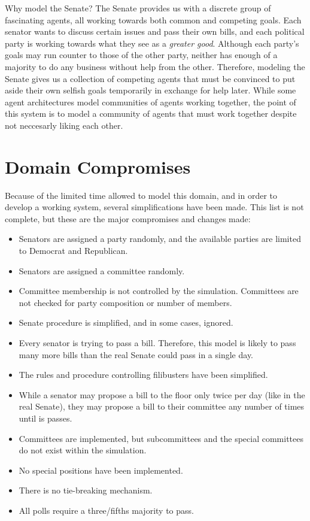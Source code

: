 \documentclass{sig-alternate}
\newenvironment{smallitem}
 {\setlength{\topsep}{0pt}
  \setlength{\partopsep}{0pt}
  \setlength{\parskip}{0pt}
  \begin{itemize}
   \setlength{\leftmargin}{.2in}
  \setlength{\parsep}{0pt}
  \setlength{\parskip}{0pt}
  \setlength{\itemsep}{0pt}}
 {\end{itemize}}
\newcommand{\bi}{\begin{smallitem}}
\newcommand{\ei}{\end{smallitem}}
\begin{document}
Why model the Senate? The Senate provides us with a discrete group of fascinating agents, all working towards both common and competing goals. Each senator wants to discuss certain issues and pass their own bills, and each political party is working towards what they see as a {\em greater good}. Although each party's goals may run counter to those of the other party, neither has enough of a majority to do any business without help from the other. Therefore, modeling the Senate gives us a collection of competing agents that must be convinced to put aside their own selfish goals temporarily in exchange for help later. While some agent architectures model communities of agents working together, the point of this system is to model a community of agents that must work together despite not neccesarly liking each other. 

\section{Domain Compromises}

Because of the limited time allowed to model this domain, and in order to develop a working system, several simplifications have been made. This list is not complete, but these are the major compromises and changes made:
\bi
\item Senators are assigned a party randomly, and the available parties are limited to Democrat and Republican.
\item Senators are assigned a committee randomly. 
\item Committee membership is not controlled by the simulation. Committees are not checked for party composition or number of members. 
\item Senate procedure is simplified, and in some cases, ignored. 
\item Every senator is trying to pass a bill. Therefore, this model is likely to pass many more bills than the real Senate could pass in a single day. 
\item The rules and procedure controlling filibusters have been simplified. 
\item While a senator may propose a bill to the floor only twice per day (like in the real Senate), they may propose a bill to their committee any number of times until is passes. 
\item Committees are implemented, but subcommittees and the special committees do not exist within the simulation.
\item No special positions have been implemented. 
\item There is no tie-breaking mechanism. 
\item All polls require a three/fifths majority to pass. 
\ei
\end{document}
